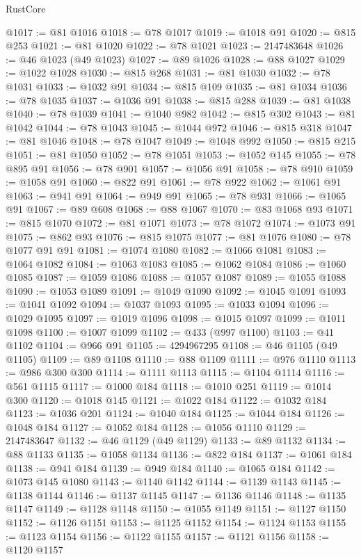 \begin{lexlean}{RustCore}
\begin{coremodule}
@1017 := @81 @1016
@1018 := @78 @1017
@1019 := @1018 @91
@1020 := @815 @253
@1021 := @81 @1020
@1022 := @78 @1021
@1023 := 2147483648
@1026 := @46 @1023 (@49 @1023)
@1027 := @89 @1026
@1028 := @88 @1027
@1029 := @1022 @1028
@1030 := @815 @268
@1031 := @81 @1030
@1032 := @78 @1031
@1033 := @1032 @91
@1034 := @815 @109
@1035 := @81 @1034
@1036 := @78 @1035
@1037 := @1036 @91
@1038 := @815 @288
@1039 := @81 @1038
@1040 := @78 @1039
@1041 := @1040 @982
@1042 := @815 @302
@1043 := @81 @1042
@1044 := @78 @1043
@1045 := @1044 @972
@1046 := @815 @318
@1047 := @81 @1046
@1048 := @78 @1047
@1049 := @1048 @992
@1050 := @815 @215
@1051 := @81 @1050
@1052 := @78 @1051
@1053 := @1052 @145
@1055 := @78 @895 @91
@1056 := @78 @901
@1057 := @1056 @91
@1058 := @78 @910
@1059 := @1058 @91
@1060 := @822 @91
@1061 := @78 @922
@1062 := @1061 @91
@1063 := @941 @91
@1064 := @949 @91
@1065 := @78 @931
@1066 := @1065 @91
@1067 := @89 @608
@1068 := @88 @1067
@1070 := @83 @1068 @93
@1071 := @815 @1070
@1072 := @81 @1071
@1073 := @78 @1072
@1074 := @1073 @91
@1075 := @862 @93
@1076 := @815 @1075
@1077 := @81 @1076
@1080 := @78 @1077 @91 @91
@1081 := @1074 @1080
@1082 := @1066 @1081
@1083 := @1064 @1082
@1084 := @1063 @1083
@1085 := @1062 @1084
@1086 := @1060 @1085
@1087 := @1059 @1086
@1088 := @1057 @1087
@1089 := @1055 @1088
@1090 := @1053 @1089
@1091 := @1049 @1090
@1092 := @1045 @1091
@1093 := @1041 @1092
@1094 := @1037 @1093
@1095 := @1033 @1094
@1096 := @1029 @1095
@1097 := @1019 @1096
@1098 := @1015 @1097
@1099 := @1011 @1098
@1100 := @1007 @1099
@1102 := @433 (@997 @1100)
@1103 := @41 @1102
@1104 := @966 @91
@1105 := 4294967295
@1108 := @46 @1105 (@49 @1105)
@1109 := @89 @1108
@1110 := @88 @1109
@1111 := @976 @1110
@1113 := @986 @300 @300
@1114 := @1111 @1113
@1115 := @1104 @1114
@1116 := @561 @1115
@1117 := @1000 @184
@1118 := @1010 @251
@1119 := @1014 @300
@1120 := @1018 @145
@1121 := @1022 @184
@1122 := @1032 @184
@1123 := @1036 @201
@1124 := @1040 @184
@1125 := @1044 @184
@1126 := @1048 @184
@1127 := @1052 @184
@1128 := @1056 @1110
@1129 := 2147483647
@1132 := @46 @1129 (@49 @1129)
@1133 := @89 @1132
@1134 := @88 @1133
@1135 := @1058 @1134
@1136 := @822 @184
@1137 := @1061 @184
@1138 := @941 @184
@1139 := @949 @184
@1140 := @1065 @184
@1142 := @1073 @145 @1080
@1143 := @1140 @1142
@1144 := @1139 @1143
@1145 := @1138 @1144
@1146 := @1137 @1145
@1147 := @1136 @1146
@1148 := @1135 @1147
@1149 := @1128 @1148
@1150 := @1055 @1149
@1151 := @1127 @1150
@1152 := @1126 @1151
@1153 := @1125 @1152
@1154 := @1124 @1153
@1155 := @1123 @1154
@1156 := @1122 @1155
@1157 := @1121 @1156
@1158 := @1120 @1157

\end{coremodule}
\end{lexlean}
